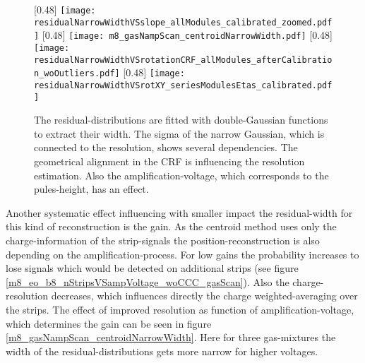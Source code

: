 \documentclass[
twoside,            %
BCOR1.4cm,          %
10pt,               %
headings=normal,    %
headsepline,        %
clearplainpage,		%
final,              %
div=14,
open=right,
bibliography=toc
]{scrreprt}
\begin{document}
\begin{figure}[!h]
	\centering
	[0.48\textwidth]
	{\texttt{[image: residualNarrowWidthVSslope\_allModules\_calibrated\_zoomed.pdf]}}
	\hfill
	[0.48\textwidth]
	{\texttt{[image: m8\_gasNampScan\_centroidNarrowWidth.pdf]}}
	\hfill
	[0.48\textwidth]
	{\texttt{[image: residualNarrowWidthVSrotationCRF\_allModules\_afterCalibration\_woOutliers.pdf]}}
	\hfill
	[0.48\textwidth]
	{\texttt{[image: residualNarrowWidthVSrotXY\_seriesModulesEtas\_calibrated.pdf]}}
	\vspace{-2mm}
	\caption{
		The residual-distributions are fitted with double-Gaussian functions to extract their width.
		The sigma of the narrow Gaussian, which is connected to the resolution, shows several dependencies. 
		The geometrical alignment in the CRF is influencing the resolution estimation.
		Also the amplification-voltage, which corresponds to the pules-height, has an effect.
	}
	\label{residualWidthDependencies} 
\end{figure}

Another systematic effect influencing with smaller impact the residual-width for this kind of reconstruction is the gain.
As the centroid method uses only the charge-information of the strip-signals the position-reconstruction is also depending on the amplification-process.
For low gains the probability increases to lose signals which would be detected on additional strips (see figure \ref{m8_eo_b8_nStripsVSampVoltage_woCCC_gasScan}).
Also the charge-resolution decreases, which influences directly the charge weighted-averaging over the strips.
The effect of improved resolution as function of amplification-voltage, which determines the gain can be seen in figure \ref{m8_gasNampScan_centroidNarrowWidth}.
Here for three gas-mixtures the width of the residual-distributions gets more narrow for higher voltages.
\end{document}
